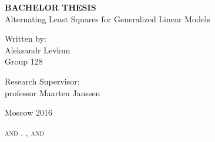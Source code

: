 {\begin{titlepage}
\vspace{3cm}

\begin{center}
\Large{\textbf{BACHELOR THESIS}\\}
\Large{Alternating Least Squares for Generalized Linear Models}
\end{center}

\vspace{1.5cm}

\begin{flushright}
\large{Written by:}\\
\large{Aleksandr Levkun\\ Group 128}\\

\vspace{6mm}

\large{Research Supervisor:\\ professor Maarten Janssen}\\
\end{flushright}

\vfill
\begin{center}
\large{Moscow 2016}
\end{center}

\end{titlepage}
\thispagestyle{empty}
\maketitle
\pagestyle{myheadings}
\markboth
 {\hfill \textsc{ \small \theruntitle} \hfill}
 {\hfill
 \textsc{ \small
 \ifau{\runauthora}
      {\runauthora and \runauthorb}
      {\runauthora, \runauthorb, and \runauthorc}
 }
 \hfill}
\thispagestyle{empty}
\newpage
\begin{abstract}
\theabstract
\end{abstract}




} %
